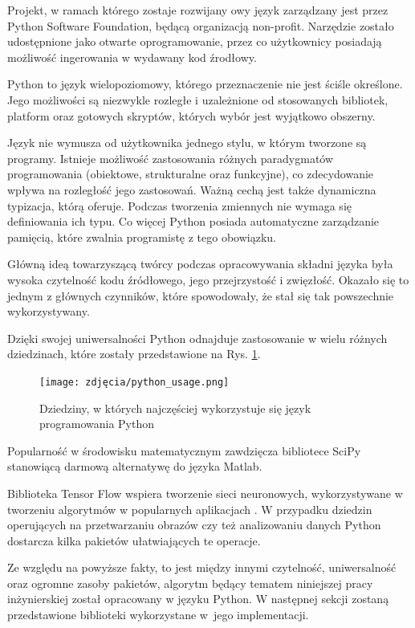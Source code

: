 Projekt, w ramach którego zostaje rozwijany owy język zarządzany jest przez Python Software Foundation, będącą organizacją non-profit. Narzędzie zostało udostępnione jako otwarte oprogramowanie, przez co użytkownicy posiadają możliwość ingerowania w wydawany kod źrodłowy.

Python to język wielopoziomowy, którego przeznaczenie nie jest ściśle określone. Jego możliwości są niezwykle rozległe i uzależnione od stosowanych bibliotek, platform oraz gotowych skryptów, których wybór jest wyjątkowo obszerny. 

Język nie wymusza od użytkownika jednego stylu, w którym tworzone są programy. Istnieje możliwość zastosowania różnych paradygmatów programowania (obiektowe, strukturalne oraz funkcyjne), co zdecydowanie wpływa na rozległość jego zastosowań. Ważną cechą jest także dynamiczna typizacja, którą oferuje. Podczas tworzenia zmiennych nie wymaga się definiowania ich typu. Co więcej Python posiada automatyczne zarządzanie pamięcią, które zwalnia programistę z tego obowiązku. 

Główną ideą towarzyszącą twórcy podczas opracowywania składni języka była wysoka czytelność kodu źródłowego, jego przejrzystość i zwięzłość. Okazało się to jednym z głównych czynników, które spowodowały, że stał się tak powszechnie wykorzystywany.

Dzięki swojej uniwersalności Python odnajduje zastosowanie w wielu różnych dziedzinach, które zostały przedstawione na Rys. \ref{fig:pythonUsage}. 

\begin{figure}[h]
	\centering
	\texttt{[image: zdjęcia/python\_usage.png]}
	\caption{Dziedziny, w których najczęściej wykorzystuje się język programowania Python \cite{PythonApps}} 
	\label{fig:pythonUsage}
\end{figure}

Popularność w środowisku matematycznym zawdzięcza bibliotece SciPy stanowiącą darmową alternatywę do języka Matlab. 

Biblioteka Tensor Flow wspiera tworzenie sieci neuronowych, wykorzystywane w tworzeniu algorytmów w popularnych aplikacjach \cite{PythonApps}. W przypadku dziedzin operujących na przetwarzaniu obrazów czy też analizowaniu danych Python dostarcza kilka pakietów ułatwiających te operacje.

Ze względu na powyższe fakty, to jest między innymi czytelność, uniwersalność oraz ogromne zasoby pakietów, algorytm będący tematem niniejszej pracy inżynierskiej został opracowany w języku Python. W następnej sekcji zostaną przedstawione biblioteki wykorzystane w~jego implementacji.

